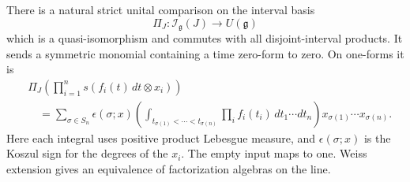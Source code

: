 \begin{theorem}\label{ogd:thm:current-time-ordering}
There is a natural strict unital comparison on the interval basis
\[
 \Pi_J:\mathcal I_{\mathfrak g}(J)\longrightarrow U(\mathfrak g)
\]
which is a quasi-isomorphism and commutes with all disjoint-interval
products. It sends a symmetric monomial containing a time zero-form
to zero. On one-forms it is
\begin{equation}\label{ogd:eq:current-chambers}
 \begin{split}
 &\Pi_J\left(\prod_{i=1}^n s(f_i(t)\,dt\otimes x_i)\right)\\
 &\quad=\sum_{\sigma\in S_n}\epsilon(\sigma;x)
   \left(\int_{t_{\sigma(1)}<\cdots<t_{\sigma(n)}}
             \prod_i f_i(t_i)\,dt_1\cdots dt_n\right)
     x_{\sigma(1)}\cdots x_{\sigma(n)}.
 \end{split}
\end{equation}
Here each integral uses positive product Lebesgue measure, and
\(\epsilon(\sigma;x)\) is the Koszul sign for the degrees of the
\(x_i\). The empty input maps to one. Weiss extension gives an
equivalence of factorization algebras on the line.
\end{theorem}

